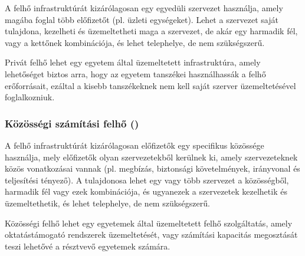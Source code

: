 \begin{commment}

A felhő infrastruktúrát kizárólagosan egy egyedüli szervezet használja, amely magába foglal több előfizetőt (pl. üzleti egységeket). Lehet a szervezet saját tulajdona, kezelheti és üzemeltetheti maga a szervezet, de akár egy harmadik fél, vagy a kettőnek kombinációja, és lehet telephelye, de nem szükségszerű.

Privát felhő lehet egy egyetem által üzemeltetett infrastruktúra, amely lehetőséget biztos arra, hogy az egyetem tanszékei használhassák a felhő erőforrásait, ezáltal a kisebb tanszékeknek nem kell saját szerver üzemeltetésével foglalkozniuk.

\subsubsection{Közösségi számítási felhő ()}

A felhő infrastruktúrát kizárólagosan előfizetők egy specifikus közössége használja, mely előfizetők olyan szervezetekből kerülnek ki, amely szervezeteknek közös vonatkozásai vannak (pl. megbízás, biztonsági követelmények, irányvonal és teljesítési tényező). A tulajdonosa lehet egy vagy több szervezet a közösségből, harmadik fél vagy ezek kombinációja, és ugyanezek a szervezetek kezelhetik és üzemeltethetik, és lehet telephelye, de nem szükségszerű.

Közösségi felhő lehet egy egyetemek által üzemeltetett felhő szolgáltatás, amely oktatástámogató rendszerek üzemeltetését, vagy számítási kapacitás megosztását teszi lehetővé a résztvevő egyetemek számára. 


\end{commment}
